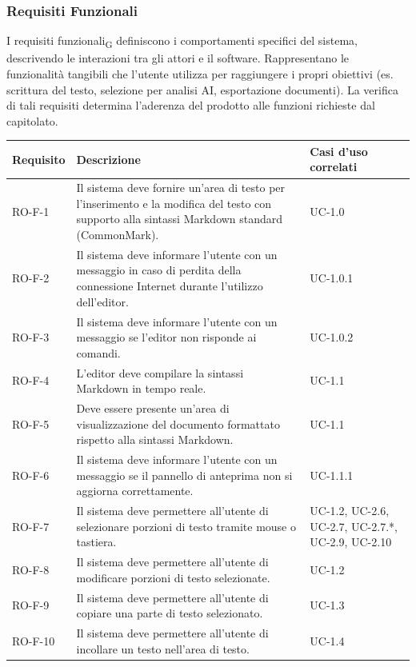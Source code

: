 \documentclass[11pt,a4paper]{article}
\begin{document}
\subsubsection{Requisiti Funzionali}
I requisiti funzionali\textsubscript{G} definiscono i comportamenti specifici del sistema, descrivendo le interazioni tra gli attori e il software.
Rappresentano le funzionalità tangibili che l'utente utilizza per raggiungere i propri obiettivi (es. scrittura del testo, selezione per analisi AI, esportazione documenti). La verifica di tali requisiti determina l'aderenza del prodotto alle funzioni richieste dal capitolato.

\begin{longtable}{|p{}|>{\raggedright\arraybackslash}p{}|p{}|}
\hline
\textbf{Requisito} & \textbf{Descrizione} & \textbf{Casi d'uso correlati}\\
\hline
\endhead
RO-F-1 & Il sistema deve fornire un'area di testo per l'inserimento e la modifica del testo con supporto alla sintassi Markdown standard (CommonMark). & UC-1.0 \\
\hline
RO-F-2 & Il sistema deve informare l'utente con un messaggio in caso di perdita della connessione Internet durante l'utilizzo dell'editor. & UC-1.0.1 \\
\hline
RO-F-3 & Il sistema deve informare l'utente con un messaggio se l'editor non risponde ai comandi. & UC-1.0.2 \\
\hline
RO-F-4 & L'editor deve compilare la sintassi Markdown in tempo reale. & UC-1.1 \\
\hline
RO-F-5 & Deve essere presente un'area di visualizzazione del documento formattato rispetto alla sintassi Markdown. & UC-1.1 \\
\hline
RO-F-6 & Il sistema deve informare l'utente con un messaggio se il pannello di anteprima non si aggiorna correttamente. & UC-1.1.1 \\
\hline
RO-F-7 & Il sistema deve permettere all'utente di selezionare porzioni di testo tramite mouse o tastiera. & UC-1.2, UC-2.6, UC-2.7, UC-2.7.*, UC-2.9, UC-2.10 \\
\hline
RO-F-8 & Il sistema deve permettere all'utente di modificare porzioni di testo selezionate. & UC-1.2 \\
\hline
RO-F-9 & Il sistema deve permettere all'utente di copiare una parte di testo selezionato. & UC-1.3 \\
\hline
RO-F-10 & Il sistema deve permettere all'utente di incollare un testo nell'area di testo. & UC-1.4 \\

\end{longtable}
\end{document}
